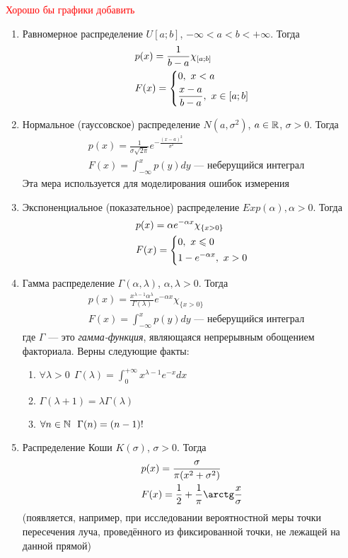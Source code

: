 \textcolor{red}{Хорошо бы графики добавить}

\begin{enumerate}
	\item Равномерное распределение $U[a; b]$, $-\infty < a < b < +\infty$. Тогда
	\begin{align*}
		&{p(x) = \frac{1}{b - a}\chi_{[a; b]}}
		\\
		&{F(x) = \left\{\begin{aligned}
			&{0,\ x < a}
			\\
			&{\frac{x - a}{b - a},\ x \in [a; b]}
		\end{aligned}\right.}
	\end{align*}
	
	\item Нормальное (гауссовское) распределение $N(a, \sigma^2)$, $a \in \mathbb{R}$, $\sigma > 0$. Тогда
	\begin{align*}
		&{p(x) = \frac{1}{\sigma\sqrt{2\pi}}e^{-\frac{(x - a)^2}{\sigma^2}}}
		\\
		&{F(x) = \int_{-\infty}^x p(y)dy \text{ --- неберущийся интеграл}}
	\end{align*}
	Эта мера используется для моделирования ошибок измерения
	
	\item Экспоненциальное (показательное) распределение $Exp(\alpha), \alpha > 0$. Тогда
	\begin{align*}
		&{p(x) = \alpha e^{-\alpha x}\chi_{\{x > 0\}}}
		\\
		&{F(x) = \left\{\begin{aligned}
			&{0,\ x \leqslant 0}
			\\
			&{1 - e^{-\alpha x},\ x > 0}
		\end{aligned}\right.}
	\end{align*}
	
	\item Гамма распределение $\Gamma(\alpha, \lambda)$, $\alpha, \lambda > 0$. Тогда
	\begin{align*}
		&{p(x) = \frac{x^{\lambda - 1}\alpha^\lambda}{\Gamma(\lambda)}e^{-\alpha x} \chi_{\{x > 0\}}}
		\\
		&{F(x) = \int_{-\infty}^x p(y)dy \text{ --- неберущийся интеграл}}
	\end{align*}
	где $\Gamma$ --- это \textit{гамма-функция}, являющаяся непрерывным обощением факториала. Верны следующие факты:
	\begin{enumerate}
		\item \(\forall \lambda > 0\ \ \Gamma(\lambda) = \int_0^{+\infty} x^{\lambda - 1}e^{-x}dx\)
		
		\item \(\Gamma(\lambda + 1) = \lambda\Gamma(\lambda)\)
		
		\item \(\forall n \in \mathbb{N}\ \ \Gamma(n) = (n - 1)!\)
	\end{enumerate}

	\item Распределение Коши $K(\sigma)$, $\sigma > 0$. Тогда
	\begin{align*}
		&{p(x) = \frac{\sigma}{\pi(x^2 + \sigma^2)}}
		\\
		&{F(x) = \frac{1}{2} + \frac{1}{\pi} \arctg \frac{x}{\sigma}}
	\end{align*}
	(появляется, например, при исследовании вероятностной меры точки пересечения луча, проведённого из фиксированной точки, не лежащей на данной прямой)
\end{enumerate}

